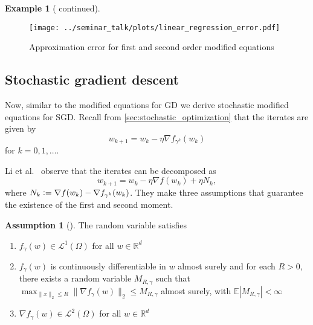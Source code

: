 \documentclass[12pt]{article}
\theoremstyle{definition}
\newtheorem{example}[example]{Example}
\newtheorem{assumption}[assumption]{Assumption}
\numberwithin{equation}{section}
\newcommand{\R}{\mathbb{R}}
\newcommand{\norm}[1]{\lVert{#1}\rVert_2}
\newcommand{\defeq}{\vcentcolon=}
\begin{document}
\begin{example}[ continued]
  \begin{figure}[htb]
    \centering
    \texttt{[image: ../seminar\_talk/plots/linear\_regression\_error.pdf]}
    \caption{Approximation error for first and second order modified equations}
    \label{fig:linear_regression_error}
  \end{figure}
\end{example}
\subsection{Stochastic gradient descent}
\label{sec:smde_sgd}
Now, similar to the modified equations for GD we derive stochastic modified equations for SGD. 
Recall from \autoref{sec:stochastic_optimization} that the iterates are given by
\begin{equation*}
  w_{k+1} = w_{k} - \eta \nabla f_{\gamma^k}(w_{k})
\end{equation*}
for $k = 0,1,\dots$. 

Li et al.\ \cite{liStochasticModifiedEquations2019} observe that the iterates can be decomposed as
\begin{equation}
  \label{eq:sgd_decomposition}
  w_{k+1} = w_{k} - \eta \nabla f(w_{k}) + \eta N_k,
\end{equation}
where $N_k \defeq \nabla f(w_{k}) - \nabla f_{\gamma^k}(w_{k})$.
They make three assumptions that guarantee the existence of the first and second moment.
\begin{assumption}[]
  \label{as:sde_model}
  The random variable satisfies 
  \begin{enumerate}[label=(\roman*)]
    \item $f_{\gamma}(w) \in \mathcal{L}^1(\Omega)$ for all $w \in \R^d$
    \item \label{as:bounded_gradient} $f_{\gamma}(w)$ is continuously differentiable in $w$ almost surely and for each $R > 0$, there exists a random variable $M_{R,\gamma}$ such that $\max_{\norm{x} \leq R} \norm{ \nabla f_{\gamma}(w) } \leq M_{R,\gamma}$ almost surely, with $\mathbb{E} |M_{R,\gamma}| < \infty$
    \item $\nabla f_{\gamma}(w) \in \mathcal{L}^2(\Omega)$ for all $w \in \R^d$
  \end{enumerate}
\end{assumption}
\end{document}
